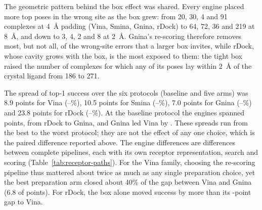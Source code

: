 The geometric pattern behind the box effect was shared. Every engine placed more top poses in
the wrong site as the box grew: from 20, 30, 4 and 91 complexes at \SI{4}{\angstrom}
padding (Vina, Smina, Gnina, rDock) to 64, 72, 36 and 219 at \SI{8}{\angstrom}, and down
to 3, 4, 2 and 8 at \SI{2}{\angstrom}. Gnina's re-scoring therefore removes most, but not
all, of the wrong-site errors that a larger box invites, while rDock, whose cavity grows
with the box, is the most exposed to them: the tight box raised the number of complexes for
which any of its poses lay within \SI{2}{\angstrom} of the crystal ligand from 186 to 271.

The spread of top-1 success over the six protocols (baseline and five arms) was 8.9 points for Vina
(--\%), 10.5 points for Smina (--\%), 7.0 points for Gnina
(--\%) and 23.8 points for rDock (--\%). At the baseline protocol the
engines spanned  points, from rDock to Gnina, and Gnina led Vina by . These spreads
run from the best to the worst protocol; they are not the effect of any one choice, which is
the paired difference reported above. The engine differences are differences between complete
pipelines, each with its own receptor representation, search and scoring
(Table~\ref{tab:receptor-paths}). For the Vina family, choosing the re-scoring pipeline
thus mattered about twice as much as any single preparation choice, yet the best preparation arm closed about 40\% of the gap between Vina
and Gnina (6.8 of  points). For rDock, the box alone moved success by more than its
-point gap to Vina.

